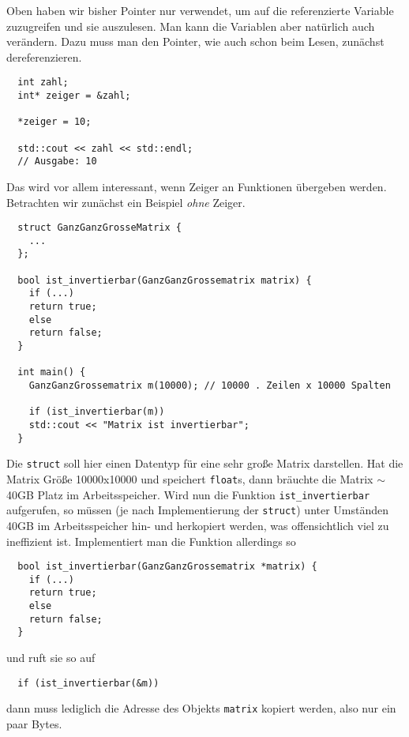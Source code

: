 \documentclass[
fontsize = 11pt,
paper    = a4,
BCOR     = 5mm,
DIV      = 12,
numbers  = noenddot,
]{scrartcl}
\begin{document}
Oben haben wir bisher Pointer nur verwendet, um auf die referenzierte
Variable zuzugreifen und sie auszulesen. Man kann die Variablen aber
natürlich auch verändern. Dazu muss man den Pointer, wie auch schon
beim Lesen, zunächst dereferenzieren.
\begin{lstlisting}
  int zahl;
  int* zeiger = &zahl;

  *zeiger = 10;

  std::cout << zahl << std::endl;
  // Ausgabe: 10
\end{lstlisting}
Das wird vor allem interessant, wenn Zeiger an Funktionen übergeben
werden.  Betrachten wir zunächst ein Beispiel \emph{ohne} Zeiger.
\begin{lstlisting}
  struct GanzGanzGrosseMatrix {
    ...
  };

  bool ist_invertierbar(GanzGanzGrossematrix matrix) {
    if (...)
    return true;
    else
    return false; 
  }

  int main() {
    GanzGanzGrossematrix m(10000); // 10000 . Zeilen x 10000 Spalten

    if (ist_invertierbar(m))
    std::cout << "Matrix ist invertierbar";
  }  
\end{lstlisting}
Die \lstinline{struct} soll hier einen Datentyp für eine sehr große
Matrix darstellen. Hat die Matrix Größe 10000x10000 und speichert
\lstinline{float}s, dann bräuchte die Matrix $\sim$ 40GB Platz im
Arbeitsspeicher. Wird nun die Funktion \lstinline{ist_invertierbar}
aufgerufen, so müssen (je nach Implementierung der \lstinline{struct})
unter Umständen 40GB im Arbeitsspeicher hin- und herkopiert werden,
was offensichtlich viel zu ineffizient ist. Implementiert man die
Funktion allerdings so
\begin{lstlisting}
  bool ist_invertierbar(GanzGanzGrossematrix *matrix) {
    if (...)
    return true;
    else
    return false; 
  }
\end{lstlisting}
und ruft sie so auf
\begin{lstlisting}
  if (ist_invertierbar(&m))
\end{lstlisting}
dann muss lediglich die Adresse des Objekts \lstinline{matrix} kopiert
werden, also nur ein paar Bytes.
\end{document}
